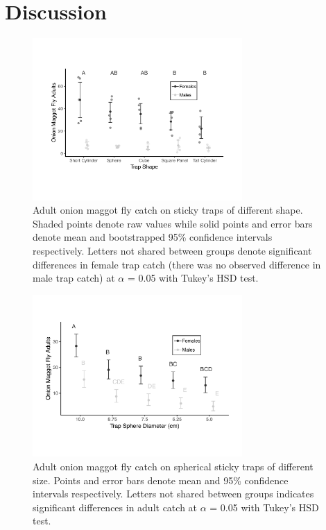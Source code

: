 \documentclass[alpha-refs]{wiley-article}
\begin{document}
\section{Discussion}

\begin{figure}[bt]
\centering
\includegraphics[width = 8cm]{figures/publication/figure-1.pdf}
\caption{Adult onion maggot fly catch on sticky traps of different shape.  Shaded points denote raw values while solid points and error bars denote mean and bootstrapped 95\% confidence intervals respectively.  Letters not shared between groups denote significant differences in female trap catch (there was no observed difference in male trap catch) at $\alpha$ = 0.05 with Tukey's HSD test. }
\label{fig:figure1}
\end{figure}

\begin{figure}[bt]
\centering
\includegraphics[width = 8cm]{figures/publication/figure-2.pdf}
\caption{Adult onion maggot fly catch on spherical sticky traps of different size.  Points and error bars denote mean and 95\% confidence intervals respectively.  Letters not shared between groups indicates significant differences in adult catch at $\alpha$ = 0.05 with Tukey's HSD test.}
\label{fig:figure2}
\end{figure}
\end{document}
